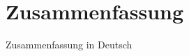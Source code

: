 %
%

\thispagestyle{empty}
\chapter*{Zusammenfassung}\label{chap.zusammenfassung}
Zusammenfassung in Deutsch

